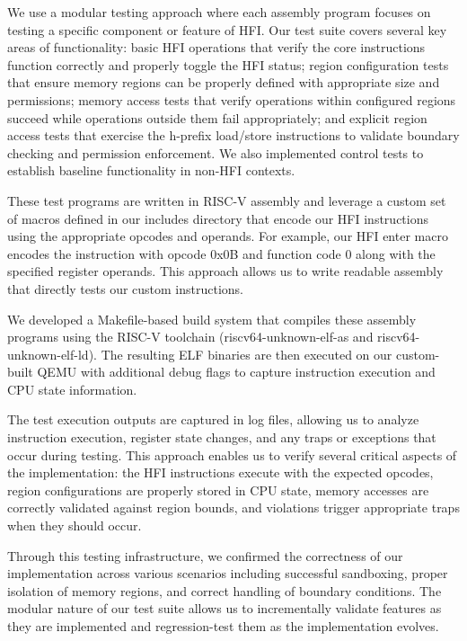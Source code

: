 \documentclass[conference,compsoc]{IEEEtran}
\begin{document}
We use a modular testing approach where each assembly program focuses on testing a specific component or feature of HFI. Our test suite covers several key areas of functionality: basic HFI operations that verify the core instructions function correctly and properly toggle the HFI status; region configuration tests that ensure memory regions can be properly defined with appropriate size and permissions; memory access tests that verify operations within configured regions succeed while operations outside them fail appropriately; and explicit region access tests that exercise the h-prefix load/store instructions to validate boundary checking and permission enforcement. We also implemented control tests to establish baseline functionality in non-HFI contexts.

These test programs are written in RISC-V assembly and leverage a custom set of macros defined in our includes directory that encode our HFI instructions using the appropriate opcodes and operands. For example, our HFI enter macro encodes the instruction with opcode 0x0B and function code 0 along with the specified register operands. This approach allows us to write readable assembly that directly tests our custom instructions.

We developed a Makefile-based build system that compiles these assembly programs using the RISC-V toolchain (riscv64-unknown-elf-as and riscv64-unknown-elf-ld). The resulting ELF binaries are then executed on our custom-built QEMU with additional debug flags to capture instruction execution and CPU state information.

The test execution outputs are captured in log files, allowing us to analyze instruction execution, register state changes, and any traps or exceptions that occur during testing. This approach enables us to verify several critical aspects of the implementation: the HFI instructions execute with the expected opcodes, region configurations are properly stored in CPU state, memory accesses are correctly validated against region bounds, and violations trigger appropriate traps when they should occur.

Through this testing infrastructure, we confirmed the correctness of our implementation across various scenarios including successful sandboxing, proper isolation of memory regions, and correct handling of boundary conditions. The modular nature of our test suite allows us to incrementally validate features as they are implemented and regression-test them as the implementation evolves.
\end{document}
